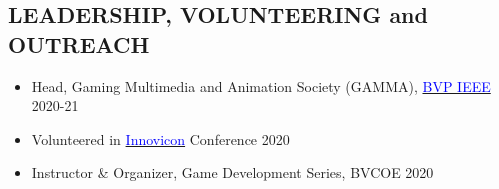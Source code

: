 \documentclass[11pt]{res} %
\newcommand{\titlegap}{5pt} %
\newcommand{\sectgap}{0.05in} %
\begin{document}
\begin{resume}










\section{LEADERSHIP, VOLUNTEERING and OUTREACH}
\vspace{0.25in}
\begin{itemize}
    \item Head, Gaming Multimedia and Animation Society (GAMMA), \href{https://bvpieee.com/}{\textcolor{blue}{BVP IEEE}} \hfill 2020-21
    \item Volunteered in \href{https://innovicon.bvpieee.com}{\textcolor{blue}{Innovicon}} Conference \hfill 2020
    \item Instructor \& Organizer, Game Development Series, BVCOE \hfill 2020
\end{itemize}
\vspace{\sectgap}
\hline



\end{resume}
\end{document}

